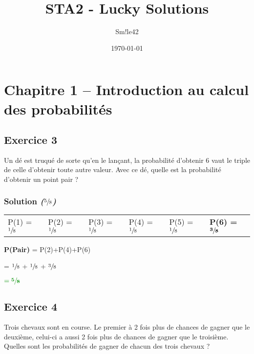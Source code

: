 \documentclass[french]{article}
\author{Sm!le42}
\date{\today}
\title{STA2 - Lucky Solutions}
\begin{document}
\maketitle
\tableofcontents


\section{Chapitre 1 -- Introduction au calcul des probabilités}
\label{sec:orgc77019c}

\subsection{Exercice 3}
\label{sec:orgce2b2e1}

Un dé est truqué de sorte qu’en le lançant, la probabilité d’obtenir 6 vaut le triple de celle d’obtenir toute autre valeur. Avec ce dé, quelle est la probabilité d’obtenir un point pair ?

\subsubsection{Solution \emph{(\(\sfrac{5}{8}\))}}
\label{sec:orgc760d17}

\begin{center}
\begin{tabular}{llllll}
P(1) = \(\sfrac{1}{8}\) & P(2) = \(\sfrac{1}{8}\) & P(3) = \(\sfrac{1}{8}\) & P(4) = \(\sfrac{1}{8}\) & P(5) = \(\sfrac{1}{8}\) & \textbf{P(6) =} \(\mathbf{\sfrac{3}{8}}\)\\
\end{tabular}
\end{center}

\begin{center}
\textbf{P(Pair)} = P(2)+P(4)+P(6)

= \(\sfrac{1}{8}\) + \(\sfrac{1}{8}\) + \(\sfrac{3}{8}\)

\(\textcolor{luckydarkgreen}{=\mathbf{\sfrac{5}{8}}}\)
\end{center}

\subsection{Exercice 4}
\label{sec:org27c804a}
Trois chevaux sont en course. Le premier à 2 fois plus de chances de gagner que le deuxième, celui-ci a aussi 2 fois plus de chances de gagner que le troisième. Quelles sont les probabilités de gagner de chacun des trois chevaux ?
\end{document}
